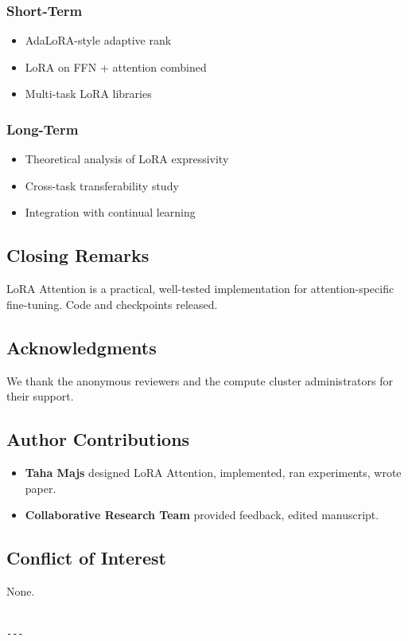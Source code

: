 \subsubsection{Short-Term}
\begin{itemize}
\item AdaLoRA-style adaptive rank
\item LoRA on FFN + attention combined
\item Multi-task LoRA libraries

\end{itemize}
\subsubsection{Long-Term}
\begin{itemize}
\item Theoretical analysis of LoRA expressivity
\item Cross-task transferability study
\item Integration with continual learning

\end{itemize}
\subsection{Closing Remarks}

LoRA Attention is a practical, well-tested implementation for 
attention-specific fine-tuning. Code and checkpoints released.

\subsection{Acknowledgments}

We thank the anonymous reviewers and the compute cluster administrators for their support.

\subsection{Author Contributions}

\begin{itemize}
\item \textbf{Taha Majs} designed LoRA Attention, implemented, ran experiments,
  wrote paper.
\item \textbf{Collaborative Research Team} provided feedback, edited manuscript.

\end{itemize}
\subsection{Conflict of Interest}

None.
\begin{lstlisting}

---
\end{lstlisting}
